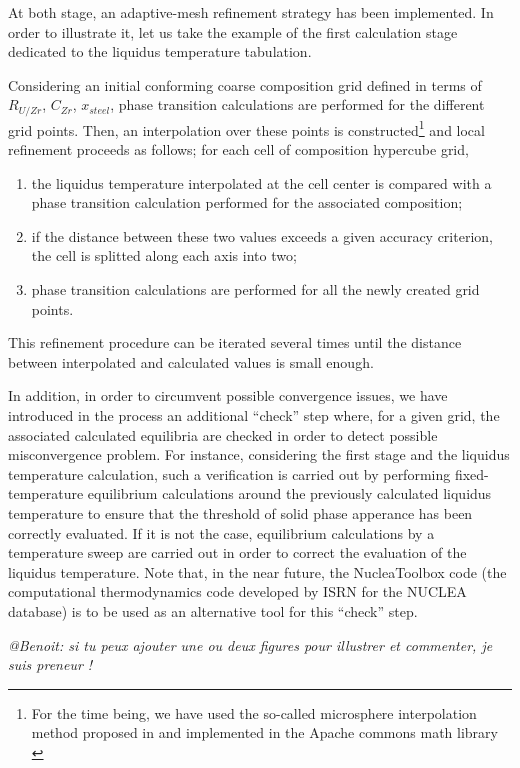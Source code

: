 \documentclass[11pt]{article}\usepackage{geometry} \geometry{letterpaper, margin=25.4mm}
\begin{document}
At both stage, an adaptive-mesh refinement strategy has been implemented. In order to illustrate it, let us take the example of the first calculation stage dedicated to the liquidus temperature tabulation. 

Considering an initial conforming coarse composition grid defined in terms of $R_{U/Zr}$, $C_{Zr}$, $x_{steel}$, phase transition calculations are performed for the different grid points. Then, an interpolation over these points is constructed\footnote{For the time being, we have used the so-called microsphere interpolation method proposed in \cite{Dudziak2007} and implemented in the Apache commons math library \cite{Apache2016}} and local refinement proceeds as follows; for each cell of composition hypercube grid,
\begin{enumerate}
 \item the liquidus temperature interpolated at the cell center is compared with a phase transition calculation performed for the associated composition;
 \item if the distance between these two values exceeds a given accuracy criterion, the cell is splitted along each axis into two;
 \item phase transition calculations are performed for all the newly created grid points.
\end{enumerate}
This refinement procedure can be iterated several times until the distance between interpolated and calculated values is small enough.

In addition, in order to circumvent possible convergence issues, we have introduced in the process an additional ``check'' step where, for a given grid, the associated calculated equilibria are checked in order to detect possible misconvergence problem. For instance, considering the first stage and the liquidus temperature calculation, such a verification is carried out by performing fixed-temperature equilibrium calculations around the previously calculated liquidus temperature to ensure that the threshold of solid phase apperance has been correctly evaluated. If it is not the case, equilibrium calculations by a temperature sweep are carried out in order to correct the evaluation of the liquidus temperature. Note that, in the near future, the NucleaToolbox code (the computational thermodynamics code developed by ISRN for the NUCLEA database) is to be used as an alternative tool for this ``check'' step.


\emph{@Benoit: si tu peux ajouter une ou deux figures pour illustrer et commenter, je suis preneur !}
\end{document}
